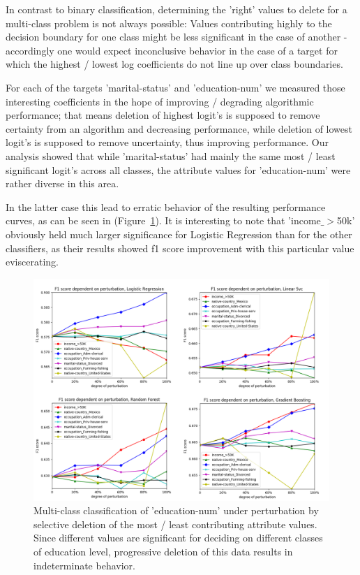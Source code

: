 \documentclass{llncs}
\begin{document}
In contrast to binary classification, determining the 'right' values to delete for a multi-class problem is not always possible: Values contributing highly to the decision boundary for one class might be less significant in the case of another - accordingly one would expect inconclusive behavior in the case of a target for which the highest / lowest log coefficients do not line up over class boundaries.

For each of the targets 'marital-status' and 'education-num' we measured those interesting coefficients in the hope of improving / degrading algorithmic performance; that means deletion of highest logit's is supposed to remove certainty from an algorithm and decreasing performance, while deletion of lowest logit's is supposed to remove uncertainty, thus improving performance. Our analysis showed that while 'marital-status' had mainly the same most / least significant logit's across all classes, the attribute values for 'education-num' were rather diverse in this area.


In the latter case this lead to erratic behavior of the resulting performance curves, as can be seen in (Figure~\ref{fig:results_perturbation_education_num}). It is interesting to note that 'income$\_>$50k' obviously held much larger significance for Logistic Regression than for the other classifiers, as their results showed f1 score improvement with this particular value eviscerating.


\begin{figure}[H]
	\centering
	\includegraphics[width=1\textwidth]{figures/perturbation/adults_education_num/perturb_education_combined}
	\caption{Multi-class classification of 'education-num' under perturbation by selective deletion of the most / least contributing attribute values. Since different values are significant for deciding on different classes of education level, progressive deletion of this data results in indeterminate behavior.}
	\label{fig:results_perturbation_education_num}
\end{figure}
\end{document}
